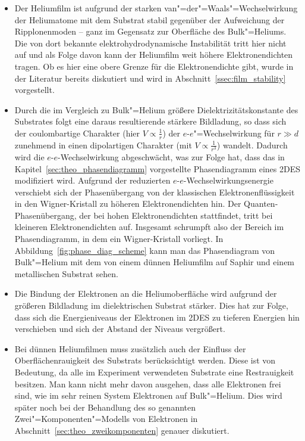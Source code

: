 \begin{itemize}
    \item Der Heliumfilm ist aufgrund der starken van"=der"=Waals"=Wechselwirkung der Heliumatome mit dem Substrat stabil gegenüber der Aufweichung der Ripplonenmoden -- ganz im Gegensatz zur Oberfläche des Bulk"=Heliums. Die von dort bekannte elektrohydrodynamische Instabilität tritt hier nicht auf und als Folge davon kann der Heliumfilm weit höhere Elektronendichten tragen. Ob es hier eine obere Grenze für die Elektronendichte gibt, wurde in der Literatur \cite{Ike81,Etz84,Hu90} bereits diskutiert und wird in Abschnitt~\ref{ssec:film_stability} vorgestellt.
    \item Durch die im Vergleich zu Bulk"=Helium größere Dielektrizitätskonstante des Substrates folgt eine daraus resultierende stärkere Bildladung, so dass sich der coulombartige Charakter (hier $V\propto \frac1r$) der $e$-$e$"=Wechselwirkung für $r\gg d$ zunehmend in einen dipolartigen Charakter (mit $V\propto\frac1{r^3}$) wandelt. Dadurch wird die $e$-$e$-Wechselwirkung abgeschwächt, was zur Folge hat, dass das in Kapitel~\ref{sec:theo_phasendiagramm} vorgestellte Phasendiagramm eines 2DES modifiziert wird. Aufgrund der reduzierten $e$-$e$-Wechselwirkungsenergie verschiebt sich der Phasenübergang von der klassischen Elektronenflüssigkeit in den Wigner-Kristall zu höheren Elektronendichten hin. Der Quanten-Phasenübergang, der bei hohen Elektronendichten stattfindet, tritt bei kleineren Elektronendichten auf. Insgesamt schrumpft also der Bereich im Phasendiagramm, in dem ein Wigner-Kristall vorliegt. In Abbildung~\ref{fig:phase_diag_scheme} kann man das Phasendiagram von Bulk"=Helium mit dem von einem dünnen Heliumfilm auf Saphir und einem metallischen Substrat sehen. 
    \item Die Bindung der Elektronen an die Heliumoberfläche wird aufgrund der größeren Bildladung im dielektrischen Substrat stärker. Dies hat zur Folge, dass sich die Energieniveaus der Elektronen im 2DES zu tieferen Energien hin verschieben und sich der Abstand der Niveaus vergrößert.
    \item Bei dünnen Heliumfilmen muss zusätzlich auch der Einfluss der Oberflächenrauigkeit des Substrats berücksichtigt werden. Diese ist von Bedeutung, da alle im Experiment verwendeten Substrate eine Restrauigkeit besitzen. Man kann nicht mehr davon ausgehen, dass alle Elektronen frei sind, wie im sehr reinen System Elektronen auf Bulk"=Helium. Dies wird später noch bei der Behandlung des so genannten Zwei"=Komponenten"=Modells von Elektronen in Abschnitt~\ref{sec:theo_zweikomponenten} genauer diskutiert.
\end{itemize}

